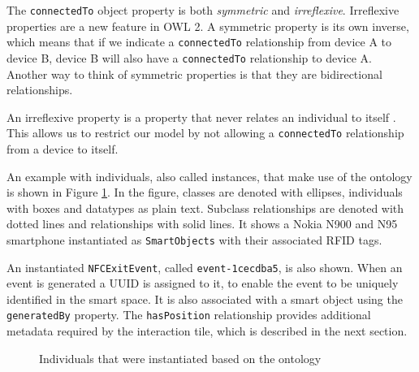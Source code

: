 The \texttt{connectedTo} object property is both \emph{symmetric} and \emph{irreflexive}. Irreflexive properties are a new feature in \ac{OWL} 2. A symmetric property is its own inverse, which means that if we indicate a \texttt{connectedTo} relationship from device A to device B, device B will also have a \texttt{connectedTo} relationship to device A. Another way to think of symmetric properties is that they are bidirectional relationships. 

An irreflexive property is a property that never relates an individual to itself \cite{Hebeler2009}. This allows us to restrict our model by not allowing a \texttt{connectedTo} relationship from a device to itself.


An example with individuals, also called instances, that make use of the ontology is shown in Figure \ref{ontologyInstance}. In the figure, classes are denoted with ellipses, individuals with boxes and datatypes as plain text. Subclass relationships are denoted with dotted lines and relationships with solid lines. It shows a Nokia N900 and N95 smartphone instantiated as \texttt{SmartObjects} with their associated \ac{RFID} tags.

An instantiated \texttt{NFCExitEvent}, called \texttt{event-1cecdba5}, is also shown. When an event is generated a \ac{UUID} is assigned to it, to enable the event to be uniquely identified in the smart space. It is also associated with a smart object using the \texttt{generatedBy} property. The \texttt{hasPosition} relationship provides additional metadata required by the interaction tile, which is described in the next section.  

\begin{figure}[bth]
	\caption{Individuals that were instantiated based on the ontology}
	\label{ontologyInstance}
\end{figure}


